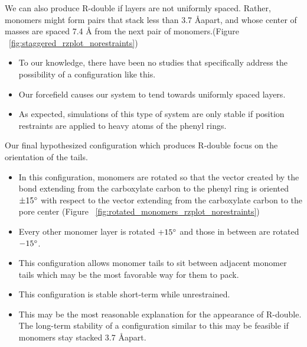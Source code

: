 \documentclass{article}
\begin{document}
  We can also produce R-double if layers are not uniformly spaced. Rather, monomers might form 
  pairs that stack less than 3.7 \AA apart, and whose center of masses are spaced 7.4 \AA 
  from the next pair of monomers.(Figure ~\ref{fig:staggered_rzplot_norestraints})
  \begin{itemize}
  		\item To our knowledge, there have been no studies that specifically address the 
  		possibility of a configuration like this. 
  		\item Our forcefield causes our system to tend towards uniformly spaced layers. 
  		\item As expected, simulations of this type of system are only stable if position
  		restraints are applied to heavy atoms of the phenyl rings.
  \end{itemize}
  
   Our final hypothesized configuration which produces R-double focus on the orientation of the
   tails. 
   \begin{itemize}
  		\item In this configuration, monomers are rotated so that the vector created by the  
  		bond extending from the carboxylate carbon to the phenyl ring is oriented $\pm 15 	
  		\degree$ with respect to the vector extending from the carboxylate carbon to the pore
  		center (Figure ~\ref{fig:rotated_monomers_rzplot_norestraints})
  		\item Every other monomer layer is rotated $+15 \degree$ and those in between are
  		rotated $-15 \degree$.
  		\item This configuration allows monomer tails to sit between adjacent monomer tails 
  		which may be the most favorable way for them to pack. 
  		\item This configuration is stable short-term while unrestrained.
  		\item This may be the most reasonable explanation for the appearance of R-double. The
  		long-term stability of a configuration similar to this may be feasible if monomers
  		stay stacked 3.7 \AA apart. 
  \end{itemize}
  
\end{document}
